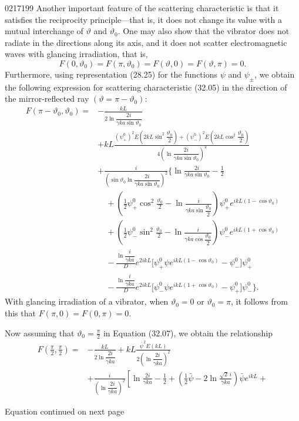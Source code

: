 \begin{scanpage}{0217}{199}
Another important feature of the scattering characteristic is that it satisfies the reciprocity principle---that is, it does not change its value with a mutual interchange of $\vartheta$ and $\vartheta_0$. One may also show that the vibrator does not radiate in the directions along its axis, and it does not scatter electromagnetic waves with glancing irradiation, that is,
\[F(0,\vartheta_0)=F(\pi,\vartheta_0)=F(\vartheta,0)=F(\vartheta,\pi)=0.\tag{32.06}\]
Furthermore, using representation (28.25) for the functions $\psi$ and $\psi_\pm$, we obtain the following expression for scattering characteristic (32.05) in the direction of the mirror-reflected ray $(\vartheta=\pi-\vartheta_0)$:
\[\begin{aligned}
F(\pi-\vartheta_0,\vartheta_0)={}&-\frac{kL}{2\ln\dfrac{2i}{\gamma ka\sin\vartheta_0}}\\
&+kL\frac{(\psi_+^0)^2E\left(2kL\sin^2\dfrac{\vartheta_0}2\right)+(\psi_-^0)^2E\left(2kL\cos^2\dfrac{\vartheta_0}2\right)}{4\left(\ln\dfrac{2i}{\gamma ka\sin\vartheta_0}\right)^2}\\
&+\frac{i}{\left(\sin\vartheta_0\ln\dfrac{2i}{\gamma ka\sin\vartheta_0}\right)^2}\Biggl\{\ln\frac{2i}{\gamma ka\sin\vartheta_0}-\frac12\\
&\quad+\left(\frac12\psi_+^0\cos^2\frac{\vartheta_0}2-\ln\frac{i}{\gamma ka\sin\dfrac{\vartheta_0}2}\right)\psi_+^0e^{ikL(1-\cos\vartheta_0)}\\
&\quad+\left(\frac12\psi_-^0\sin^2\frac{\vartheta_0}2-\ln\frac{i}{\gamma ka\cos\dfrac{\vartheta_0}2}\right)\psi_-^0e^{ikL(1+\cos\vartheta_0)}\\
&\quad-\frac{\ln\dfrac{i}{\gamma ka}}D e^{2ikL}\bigl[\psi_+^0\psi e^{ikL(1-\cos\vartheta_0)}-\psi_-^0\bigr]\psi_+^0\\
&\quad-\frac{\ln\dfrac{i}{\gamma ka}}D e^{2ikL}\bigl[\psi_-^0\psi e^{ikL(1+\cos\vartheta_0)}-\psi_+^0\bigr]\psi_-^0\Biggr\}.
\end{aligned}\tag{32.07}\]
With glancing irradiation of a vibrator, when $\vartheta_0=0$ or $\vartheta_0=\pi$, it follows from this that $F(\pi,0)=F(0,\pi)=0$.

Now assuming that $\vartheta_0=\frac\pi2$ in Equation (32.07), we obtain the relationship
\[\begin{aligned}
F\left(\frac\pi2,\frac\pi2\right)={}&-\frac{kL}{2\ln\dfrac{2i}{\gamma ka}}+kL\frac{\bar\psi^2 E(kL)}{2\left(\ln\dfrac{2i}{\gamma ka}\right)^2}\\
&+\frac{i}{\left(\ln\dfrac{2i}{\gamma ka}\right)^2}\left[\ln\frac{2i}{\gamma ka}-\frac12+\left(\frac12\bar\psi-2\ln\frac{\sqrt2\,i}{\gamma ka}\right)\bar\psi e^{ikL}+\right.
\end{aligned}\]
\begin{flushright}Equation continued on next page\end{flushright}
\end{scanpage}
